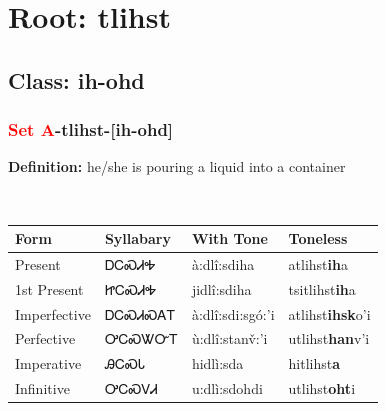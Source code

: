 \needspace{4in}
\section*{Root: tlihst}
\nopagebreak
{}
\needspace{3in}
\subsection*{Class: ih-ohd}
\nopagebreak
\needspace{2in}
\subsubsection*{\textcolor{Red}{Set A}{-}\textbf{tlihst}{-}[ih-ohd]}
\nopagebreak
\textbf{Definition: } he/she is pouring a liquid into a container
\\[0.5em]
\begin{tabularx}{\textwidth}{l X X X}%
\toprule%
\textbf{Form}&\textbf{Syllabary}&\textbf{With Tone}&\textbf{Toneless}\\%
\midrule%
Present&ᎠᏟᏍᏗᎭ&à:dlî:sdiha&atlihst\textbf{ih}a\\%
1st Present&ᏥᏟᏍᏗᎭ&jidlî:sdiha&tsitlihst\textbf{ih}a\\%
Imperfective&ᎠᏟᏍᏗᏍᎪᎢ&à:dlî:sdi:sgó:’i&atlihst\textbf{ihsk}o'i\\%
Perfective&ᎤᏟᏍᏔᏅᎢ&ù:dlî:stanv̌:’i&utlihst\textbf{han}v'i\\%
Imperative&ᎯᏟᏍᏓ&hidlì:sda&hitlihst\textbf{a}\\%
Infinitive&ᎤᏟᏍᏙᏗ&u:dlì:sdohdi&utlihst\textbf{oht}i\\%
\bottomrule%
\end{tabularx}
\\[1em]